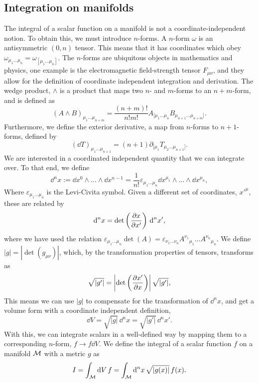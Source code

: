 \subsection{Integration on manifolds}
\label{subsection: integration on manifolds}

The integral of a scalar function on a manifold is not a coordinate-independent notion.
To obtain this, we must introduce $n$-forms.
A $n$-form $\omega$ is an antisymmetric $(0, n)$ tensor.
This means that it has coordinates which obey $\omega_{\mu_1 \dots \mu_n} = \omega_{[\mu_1 \dots \mu_n]}$.
The $n$-forms are ubiquitous objects in mathematics and physics, one example is the electromagnetic field-strength tensor $F_{\mu \nu}$, and they allow for the definition of coordinate independent integration and derivation.
The wedge product, $\wedge$ is a product that maps two $n$- and $m$-forms to an $n+m$-form, and is defined as
%
\begin{equation}
    (A\wedge B)_{\mu_1\dots\mu_{n+m}} = \frac{(n + m)!}{n! m!} A_{[\mu_1\dots\mu_n}B_{\mu_{n+1}\dots\mu_{n+m}]}.
\end{equation}
%
Furthermore, we define the exterior derivative, a map from $n$-forms to $n+1$-forms, defined by
%
\begin{equation}
    (\dd T)_{\mu_1 \dots \mu_{n+1}} = (n+1) \partial_{[\mu_1} T_{\mu_2\dots\mu_{n+1}]}.
\end{equation}
%
We are interested in a coordinated independent quantity that we can integrate over.
To that end, we define
%
\begin{equation}
    \dd^n x := \dd x^0 \wedge \dots \wedge \dd x^{n-1}
    = \frac{1}{n!} \varepsilon_{\mu_1 \dots \mu_n}  
    \dd x^{\mu_1} \wedge \dots \wedge \dd x^{\mu_n},
\end{equation}
%
Where $\varepsilon_{\mu_1 \dots \mu_n}$ is the Levi-Civita symbol.
Given a different set of coordinates, $x'^\mu$, these are related by
%
\begin{equation}
    \text{d}^n x = \det\left( \pdv{x}{x'} \right) \, \text{d}^n x',
\end{equation}
%
where we have used the relation $\varepsilon_{\mu_1 \dots \mu_n}  \det(A) = \varepsilon_{\nu_1 \dots \nu_n} A^{\nu_1}{}_{\mu_1} \dots A^{\nu_n}{}_{\mu_n}$.  
We define $|g| = |\det(g_{\mu \nu })|$, which, by the transformation properties of tensors, transforms as
%
\begin{equation}
    \sqrt{|g'|} = \left| \det\left(\pdv{x'}{x} \right) \right| \sqrt{|g'|},
\end{equation}
%
This means we can use $|g|$ to compensate for the transformation of $\dd^n x$, and get a volume form with a coordinate independent definition,
%
\begin{equation}
    \dd V = \sqrt{|g|} \, \dd^n x = \sqrt{|g'|} \, \dd^n x'.
\end{equation}
%
With this, we can integrate scalars in a well-defined way by mapping them to a corresponding $n$-form, $f \rightarrow f \dd V$.
We define the integral of a scalar function $f$ on a manifold $\mathcal{M}$ with a metric $g$ as
%
\begin{equation}
    I = \int_{\mathcal{M}} \text{d} V \, f =  \int_{\mathcal{M}} \text{d}^n x \, \sqrt{|g(x)|} \, f(x).  
\end{equation}


